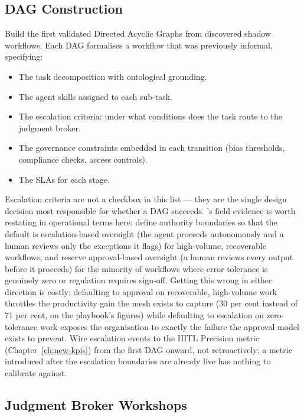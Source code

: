 \subsection{DAG Construction}

Build the first validated Directed Acyclic Graphs from discovered shadow workflows. Each DAG formalises a workflow that was previously informal, specifying:

\begin{itemize}
  \item The task decomposition with ontological grounding.
  \item The agent skills assigned to each sub-task.
  \item The escalation criteria: under what conditions does the task route to the judgment broker.
  \item The governance constraints embedded in each transition (bias thresholds, compliance checks, access controls).
  \item The SLAs for each stage.
\end{itemize}

Escalation criteria are not a checkbox in this list --- they are the single design decision most responsible for whether a DAG succeeds. \textcite{Pereira2026Playbook}'s field evidence is worth restating in operational terms here: define authority boundaries so that the default is escalation-based oversight (the agent proceeds autonomously and a human reviews only the exceptions it flags) for high-volume, recoverable workflows, and reserve approval-based oversight (a human reviews every output before it proceeds) for the minority of workflows where error tolerance is genuinely zero or regulation requires sign-off. Getting this wrong in either direction is costly: defaulting to approval on recoverable, high-volume work throttles the productivity gain the mesh exists to capture (30 per cent instead of 71 per cent, on the playbook's figures) while defaulting to escalation on zero-tolerance work exposes the organisation to exactly the failure the approval model exists to prevent. Wire escalation events to the HITL Precision metric (Chapter~\ref{ch:new-kpis}) from the first DAG onward, not retroactively: a metric introduced after the escalation boundaries are already live has nothing to calibrate against.

\subsection{Judgment Broker Workshops}

